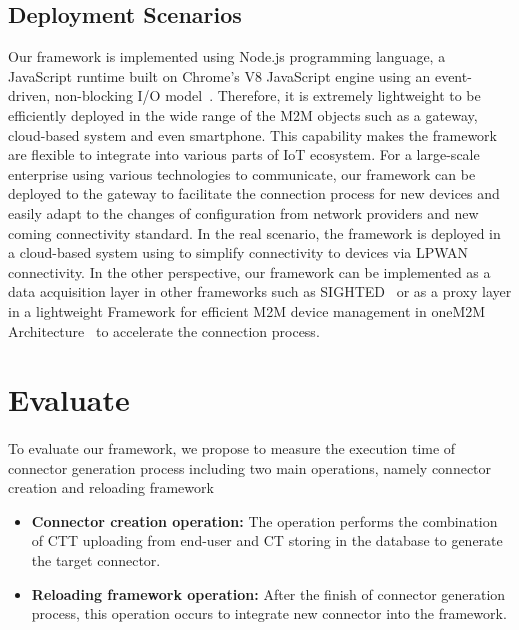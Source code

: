 \subsection{Deployment Scenarios}
Our framework is implemented using Node.js programming language, a JavaScript runtime built on Chrome's V8 JavaScript engine using an event-driven, non-blocking I/O model~\cite{joyentnodejs}. Therefore, it is extremely lightweight to be efficiently deployed in the wide range of the M2M objects such as a gateway, cloud-based system and even smartphone. This capability makes the framework are flexible to integrate into various parts of IoT ecosystem. For a large-scale enterprise using various technologies to communicate, our framework can be deployed to the gateway to facilitate the connection process for new devices and easily adapt to the changes of configuration from network providers and new coming connectivity standard. In the real scenario, the framework is deployed in a cloud-based system using to simplify connectivity to devices via LPWAN connectivity. In the other perspective, our framework can be implemented as a data acquisition layer in other frameworks such as SIGHTED~\cite{nagib2016sighted} or as a proxy layer in a lightweight Framework for efficient M2M device management in oneM2M Architecture~\cite{datta2015lightweight} to accelerate the connection process.
\section{Evaluate}
\paragraph{} To evaluate our framework, we propose to measure the execution time of connector generation process including two main operations, namely connector creation and reloading framework

\begin{itemize}
    \item \textbf{Connector creation operation: } The operation performs the combination of CTT uploading from end-user and CT storing in the database to generate the target connector.
    \item \textbf{Reloading framework operation: } After the finish of connector generation process, this operation occurs to integrate new connector into the framework.
\end{itemize}

